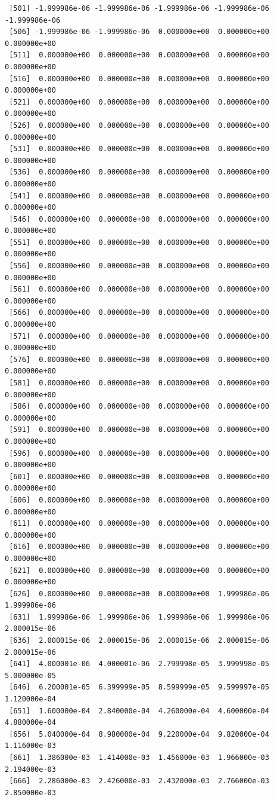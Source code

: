 \documentclass[12pt,letterpaper]{article}\usepackage[]{graphicx}\usepackage[]{color}
\begin{document}
\begin{lstlisting}
 [501] -1.999986e-06 -1.999986e-06 -1.999986e-06 -1.999986e-06 -1.999986e-06
 [506] -1.999986e-06 -1.999986e-06  0.000000e+00  0.000000e+00  0.000000e+00
 [511]  0.000000e+00  0.000000e+00  0.000000e+00  0.000000e+00  0.000000e+00
 [516]  0.000000e+00  0.000000e+00  0.000000e+00  0.000000e+00  0.000000e+00
 [521]  0.000000e+00  0.000000e+00  0.000000e+00  0.000000e+00  0.000000e+00
 [526]  0.000000e+00  0.000000e+00  0.000000e+00  0.000000e+00  0.000000e+00
 [531]  0.000000e+00  0.000000e+00  0.000000e+00  0.000000e+00  0.000000e+00
 [536]  0.000000e+00  0.000000e+00  0.000000e+00  0.000000e+00  0.000000e+00
 [541]  0.000000e+00  0.000000e+00  0.000000e+00  0.000000e+00  0.000000e+00
 [546]  0.000000e+00  0.000000e+00  0.000000e+00  0.000000e+00  0.000000e+00
 [551]  0.000000e+00  0.000000e+00  0.000000e+00  0.000000e+00  0.000000e+00
 [556]  0.000000e+00  0.000000e+00  0.000000e+00  0.000000e+00  0.000000e+00
 [561]  0.000000e+00  0.000000e+00  0.000000e+00  0.000000e+00  0.000000e+00
 [566]  0.000000e+00  0.000000e+00  0.000000e+00  0.000000e+00  0.000000e+00
 [571]  0.000000e+00  0.000000e+00  0.000000e+00  0.000000e+00  0.000000e+00
 [576]  0.000000e+00  0.000000e+00  0.000000e+00  0.000000e+00  0.000000e+00
 [581]  0.000000e+00  0.000000e+00  0.000000e+00  0.000000e+00  0.000000e+00
 [586]  0.000000e+00  0.000000e+00  0.000000e+00  0.000000e+00  0.000000e+00
 [591]  0.000000e+00  0.000000e+00  0.000000e+00  0.000000e+00  0.000000e+00
 [596]  0.000000e+00  0.000000e+00  0.000000e+00  0.000000e+00  0.000000e+00
 [601]  0.000000e+00  0.000000e+00  0.000000e+00  0.000000e+00  0.000000e+00
 [606]  0.000000e+00  0.000000e+00  0.000000e+00  0.000000e+00  0.000000e+00
 [611]  0.000000e+00  0.000000e+00  0.000000e+00  0.000000e+00  0.000000e+00
 [616]  0.000000e+00  0.000000e+00  0.000000e+00  0.000000e+00  0.000000e+00
 [621]  0.000000e+00  0.000000e+00  0.000000e+00  0.000000e+00  0.000000e+00
 [626]  0.000000e+00  0.000000e+00  0.000000e+00  1.999986e-06  1.999986e-06
 [631]  1.999986e-06  1.999986e-06  1.999986e-06  1.999986e-06  2.000015e-06
 [636]  2.000015e-06  2.000015e-06  2.000015e-06  2.000015e-06  2.000015e-06
 [641]  4.000001e-06  4.000001e-06  2.799998e-05  3.999998e-05  5.000000e-05
 [646]  6.200001e-05  6.399999e-05  8.599999e-05  9.599997e-05  1.120000e-04
 [651]  1.600000e-04  2.840000e-04  4.260000e-04  4.600000e-04  4.880000e-04
 [656]  5.040000e-04  8.980000e-04  9.220000e-04  9.820000e-04  1.116000e-03
 [661]  1.386000e-03  1.414000e-03  1.456000e-03  1.966000e-03  2.194000e-03
 [666]  2.286000e-03  2.426000e-03  2.432000e-03  2.766000e-03  2.850000e-03

\end{lstlisting}
\end{document}
